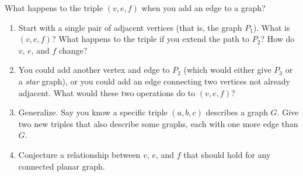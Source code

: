 \documentclass{book}
\begin{document}
\setcounter{project}{21}
\addtocounter{project}{-1}
\begin{activity}[]\label{activity-16}
\hypertarget{p-228}{}%
What happens to the triple \((v,e,f)\) when you add an edge to a graph?%
\begin{enumerate}[font=\bfseries,label=(\alph*),ref=\alph*]
\item\label{task-22} \hypertarget{p-229}{}%
Start with a single pair of adjacent vertices (that is, the graph \(P_1\)).  What is \((v,e,f)\)?  What happens to the triple if you extend the path to \(P_2\)?  How do \(v\), \(e\), and \(f\) change?%
\item\label{task-23} \hypertarget{p-230}{}%
You could add another vertex and edge to \(P_2\) (which would either give \(P_3\) or a \emph{star} graph), or you could add an edge connecting two vertices not already adjacent.  What would these two operations do to \((v,e,f)\)?%
\item\label{task-24} \hypertarget{p-231}{}%
Generalize.  Say you know a specific triple \((a,b,c)\) describes a graph \(G\).  Give two new triples that also describe some graphs, each with one more edge than \(G\).%
\item\label{task-25} \hypertarget{p-232}{}%
Conjecture a relationship between \(v\), \(e\), and \(f\) that should hold for any connected planar graph.%
\end{enumerate}
\end{activity}

\clearpage
\end{document}
